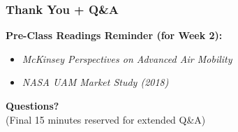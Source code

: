 \documentclass{beamer}
\begin{document}
\begin{frame}[t]
  \frametitle{Thank You + Q\&A}
  
  \textbf{Pre-Class Readings Reminder (for Week 2):}
  \begin{itemize}
      \item \textit{McKinsey Perspectives on Advanced Air Mobility}
      \item \textit{NASA UAM Market Study (2018)} 
  \end{itemize}
  
  \vspace{1cm}
  \begin{center}
      \textbf{Questions?} \\
      \small (Final 15 minutes reserved for extended Q\&A)
  \end{center}
\end{frame}
\end{document}
